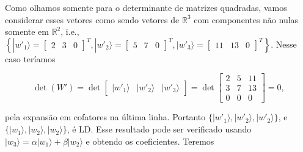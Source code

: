\documentclass[11pt]{article}
\begin{document}
Como olhamos somente para o determinante de matrizes quadradas, vamos
considerar esses vetores como sendo vetores de \(\mathbb{R}^{3}\) com
componentes não nulas somente em \(\mathbb{R}^{2}\), i.e.,
\(\left\{|w'_{1}\rangle=\begin{bmatrix} 2 & 3 & 0 \end{bmatrix}^{T},|w'_{2}\rangle=\begin{bmatrix} 5 & 7 & 0 \end{bmatrix}^{T},|w'_{3}\rangle=\begin{bmatrix} 11 & 13 & 0 \end{bmatrix}^{T}\right\}\).
Nesse caso teríamos

\begin{equation}
\det(W')=\det\begin{bmatrix} |w'_{1}\rangle & |w'_{2}\rangle & |w'_{3}\rangle\end{bmatrix}=\det\begin{bmatrix} 2 & 5 & 11 \\ 3 & 7 & 13 \\ 0 & 0 & 0 \end{bmatrix}=0,
\end{equation}

pela expansão em cofatores na última linha. Portanto
\(\{|w'_{1}\rangle,|w'_{2}\rangle,|w'_{2}\rangle\}\), e
\(\{|w_{1}\rangle,|w_{2}\rangle,|w_{2}\rangle\}\), é LD. Esse resultado
pode ser verificado usando
\(|w_{3}\rangle=\alpha|w_{1}\rangle+\beta|w_{2}\rangle\) e obtendo os
coeficientes. Teremos
\end{document}
